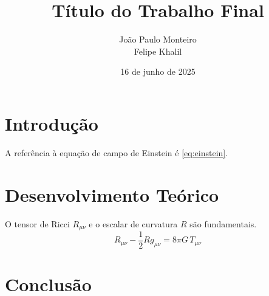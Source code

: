 \documentclass[12pt, a4paper]{article}
\begin{document}
\title{Título do Trabalho Final}

\author{João Paulo Monteiro\\ Felipe Khalil}

\date{16 de junho de 2025}

\maketitle
\tableofcontents

\newpage %


\section{Introdução}
\lipsum[1-2]
A referência à equação de campo de Einstein é \cref{eq:einstein}.

\section{Desenvolvimento Teórico}
O tensor de Ricci $R_{\mu\nu}$ e o escalar de curvatura $R$ são fundamentais.
\begin{equation}
    R_{\mu\nu} - \frac{1}{2} R g_{\mu\nu} = 8\pi G \, T_{\mu\nu}
    \label{eq:einstein}
\end{equation}
\lipsum[3]\cite{einstein1916}

\section{Conclusão}
\lipsum[4]

\newpage
\printbibliography[title={Referências}]
\end{document}
